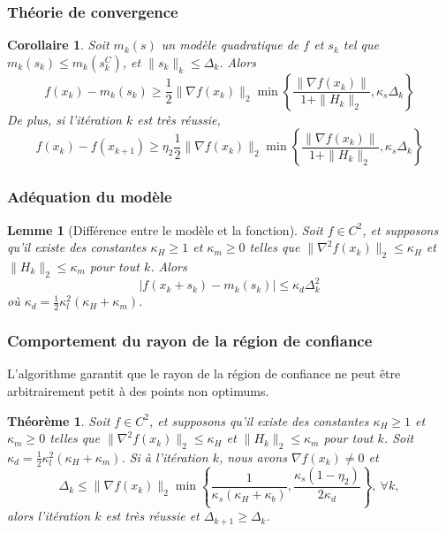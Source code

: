 \documentclass[t,usepdftitle=false]{beamer}
\newtheorem{lem}{Lemme}
\newtheorem{thm}{Théorème}
\newtheorem{coro}{Corollaire}
\begin{document}
\begin{frame}
\frametitle{Théorie de convergence}

\begin{coro}
Soit $m_k(s)$ un modèle quadratique de $f$ et $s_k$ tel que $m_k(s_k) \leq m_k(s_k^C)$, et $\| s_k \|_k \leq \Delta_k$.
Alors
$$
f(x_k) - m_k(s_k) \geq \frac{1}{2} \| \nabla f(x_k) \|_2
\min \left\{ \frac{\| \nabla f(x_k) \|}{1+\| H_k \|_2}, \kappa_s \Delta_k \right\}
$$
De plus, si l'itération $k$ est très réussie,
$$
f(x_k) - f(x_{k+1}) \geq \eta_2 \frac{1}{2} \| \nabla f(x_k) \|_2
\min \left\{ \frac{\| \nabla f(x_k) \|}{1+\| H_k \|_2}, \kappa_s \Delta_k \right\}
$$
\end{coro}

\end{frame}

\begin{frame}
\frametitle{Adéquation du modèle}

\begin{lem}[Différence entre le modèle et la fonction]
Soit $f \in C^2$, et supposons qu'il existe des constantes $\kappa_H \geq 1$ et $\kappa_m \geq 0$ telles que $\| \nabla^2 f(x_k) \|_2 \leq \kappa_H$ et $\| H_k \|_2 \leq \kappa_m$ pour tout $k$. Alors
$$
| f(x_k+s_k) - m_k(s_k) | \leq \kappa_d \Delta_k^2
$$
où $\kappa_d = \frac{1}{2} \kappa_l^2 (\kappa_H + \kappa_m)$.
\end{lem}

\end{frame}

\begin{frame}
\frametitle{Comportement du rayon de la région de confiance}

L'algorithme garantit que le rayon de la région de confiance ne peut être arbitrairement petit à des points non optimums.

\begin{thm}
	Soit $f \in C^2$, et supposons qu'il existe des constantes $\kappa_H \geq 1$ et $\kappa_m \geq 0$ telles que $\| \nabla^2 f(x_k) \|_2 \leq \kappa_H$ et $\| H_k \|_2 \leq \kappa_m$ pour tout $k$.
	Soit $\kappa_d = \frac{1}{2} \kappa_l^2 (\kappa_H + \kappa_m)$.
	Si à l'itération $k$, nous avons $\nabla f(x_k) \ne 0$ et
	$$
	\Delta_k \leq \| \nabla f(x_k) \|_2
	\min \left\{ \frac{1}{\kappa_s(\kappa_H + \kappa_b)}, \frac{\kappa_s(1-\eta_2)}{2\kappa_d} \right\},\ \forall k,
	$$
	alors l'itération $k$ est très réussie et $\Delta_{k+1} \geq \Delta_k$.
\end{thm}

\end{frame}
\end{document}
